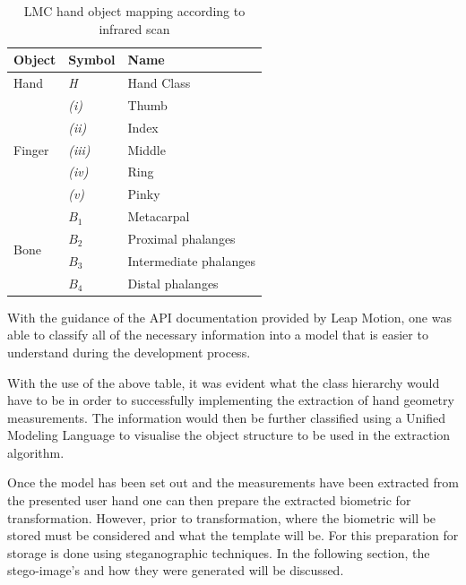 

    \begin{table}[h!]
    \caption{LMC hand object mapping according to infrared scan}
    \centering
     \begin{tabular}{|p{} | p{}| p{}|} 
     \hline
    	\textbf{Object} & \textbf{Symbol} & \textbf{Name} \\ [1ex] 
     \hline\hline 
     Hand & \textit{H} & Hand Class  \\
     \hline 
     \multirow{5}{*}{Finger} & \textit{(i)} & Thumb \\

            & \textit{(ii)} & Index     \\
     
            & \textit{(iii)} & Middle     \\
     
            & \textit{(iv)} & Ring     \\
     
            & \textit{(v)} & Pinky      \\
    \hline        
    \multirow{4}{*}{Bone} & \(B_1\) & Metacarpal\\
     
            & \(B_2\) & Proximal phalanges     \\
     
            & \(B_3\) & Intermediate phalanges     \\
     
            & \(B_4\) & Distal phalanges     \\
     \hline
     \end{tabular}
    \end{table}
    
With the guidance of the API documentation provided by Leap Motion, one was able to classify all of the necessary information into a model that is easier to understand during the development process. 

With the use of the above table, it was evident what the class hierarchy would have to be in order to successfully implementing the extraction of hand geometry measurements. The information would then be further classified using a Unified Modeling Language to visualise the object structure to be used in the extraction algorithm.

Once the model has been set out and the measurements have been extracted from the presented user hand one can then prepare the extracted biometric for transformation. However, prior to transformation, where the biometric will be stored must be considered and what the template will be. For this preparation for storage is done using steganographic techniques. In the following section, the stego-image’s and how they were generated will be discussed.

